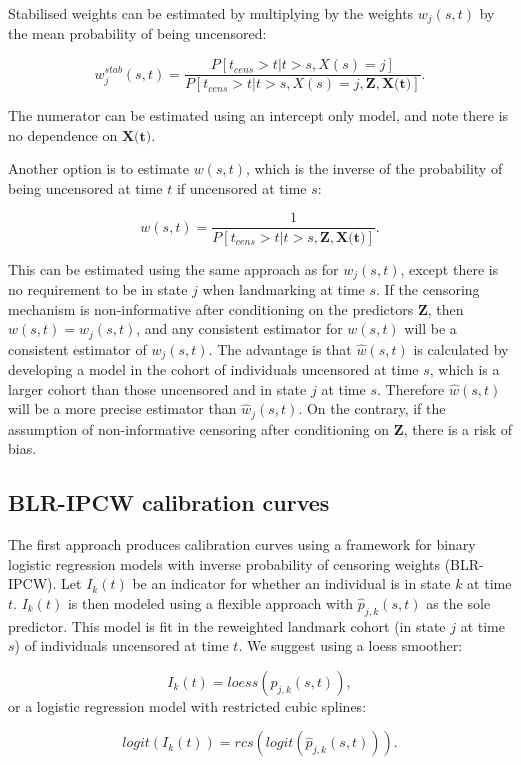 \documentclass[nojss]{jss}
\begin{document}
Stabilised weights can be estimated by multiplying by the weights $w_{j}(s, t)$ by the mean probability of being uncensored:

$$w_{j}^{stab}(s, t) = \frac{P[t_{cens} > t|t > s, X(s) = j]}{P[t_{cens} > t|t > s, X(s) = j, \textbf{Z},\textbf{X(t)}]}.$$

The numerator can be estimated using an intercept only model, and note there is no dependence on $\textbf{X(t)}$.

Another option is to estimate $w(s,t)$, which is the inverse of the probability of being uncensored at time $t$ if uncensored at time $s$:

$$w(s,t) = \frac{1}{P[t_{cens} > t|t > s, \textbf{Z},\textbf{X(t)}]}.$$

This can be estimated using the same approach as for $w_{j}(s,t)$, except there is no requirement to be in state $j$ when landmarking at time $s$. If the censoring mechanism is non-informative after conditioning on the predictors $\textbf{Z}$, then $w(s,t) = w_{j}(s,t)$, and any consistent estimator for $w(s,t)$ will be a consistent estimator of $w_{j}(s,t)$. The advantage is that $\hat{w}(s,t)$ is calculated by developing a model in the cohort of individuals uncensored at time $s$, which is a larger cohort than those uncensored and in state $j$ at time $s$. Therefore $\hat{w}(s,t)$ will be a more precise estimator than $\hat{w}_{j}(s,t)$. On the contrary, if the assumption of non-informative censoring after conditioning on $\textbf{Z}$, there is a risk of bias.

\subsection{BLR-IPCW calibration curves} \label{sec:blripcw}

The first approach produces calibration curves using a framework for binary logistic regression models with inverse probability of censoring weights (BLR-IPCW). Let $I_{k}(t)$ be an indicator for whether an individual is in state $k$ at time $t$. $I_{k}(t)$ is then modeled using a flexible approach with $\hat{p}_{j, k}(s, t)$ as the sole predictor. This model is fit in the reweighted landmark cohort (in state $j$ at time $s$) of individuals uncensored at time $t$. We suggest using a loess smoother:

$$I_{k}(t) = loess(\hat{p}_{j, k}(s, t)),$$
or a logistic regression model with restricted cubic splines:

$$logit(I_{k}(t)) = rcs(logit(\hat{p}_{j, k}(s, t))).$$
\end{document}
